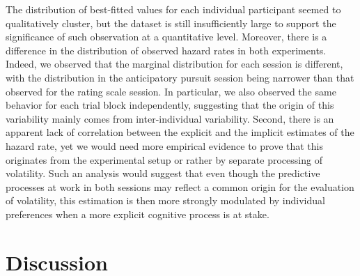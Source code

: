 \documentclass[10pt,letterpaper]{article}
\begin{document}
The distribution of best-fitted values for each individual participant seemed to qualitatively cluster,
but the dataset is still insufficiently large to support the significance of such observation
at a quantitative level.
Moreover, there is a difference in the distribution of observed hazard rates in both experiments.
Indeed, we observed that the marginal distribution for each session is different,
with the distribution in the anticipatory pursuit session being narrower than
that observed for the rating scale session.
In particular, we also observed the same behavior for each trial block independently,
suggesting that the origin of this variability mainly comes from inter-individual variability.
Second, there is an apparent lack of correlation between the explicit and the implicit estimates of the hazard rate,
yet we would need more empirical evidence to prove
that this originates from the experimental setup or rather by separate processing of volatility.
Such an analysis would suggest that even though the predictive processes
at work in both sessions may reflect a common origin for the evaluation of volatility,
this estimation is then more strongly modulated by individual preferences
when a more explicit cognitive process is at stake.
\section*{Discussion}
\label{sec:outro}
\end{document}
